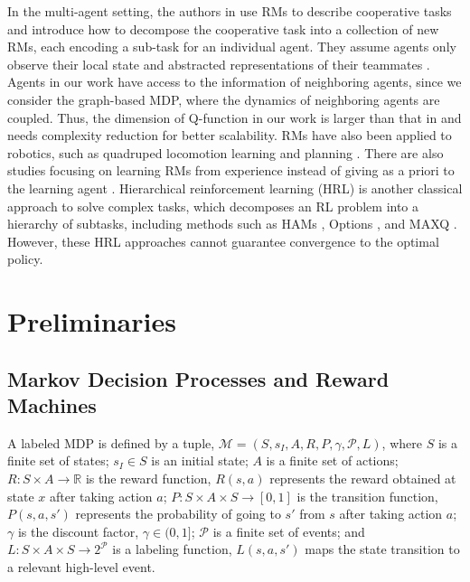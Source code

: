 \documentclass[conf]{new-aiaa}
\begin{document}
In the multi-agent setting, the authors in \cite{neary2020reward} use RMs to describe cooperative tasks and introduce how to decompose the cooperative task into a collection of new RMs, each encoding a sub-task for an individual agent. They assume agents only observe their local state and abstracted representations of their teammates \cite{neary2020reward}. Agents in our work have access to the information of neighboring agents, since we consider the graph-based MDP, where the dynamics of neighboring agents are coupled. Thus, the dimension of Q-function in our work is larger than that in \cite{neary2020reward} and needs complexity reduction for better scalability. RMs have also been applied to robotics, such as quadruped locomotion learning \cite{defazio2021learning} and planning \cite{shah2020planning}. There are also studies focusing on learning RMs from experience instead of giving as a priori to the learning agent \cite{xu2020joint, toro2019learning,furelos2020induction,furelos2021induction,hasanbeig2021deepsynth,rens2020learning}. Hierarchical reinforcement learning (HRL) is another classical approach to solve complex tasks, which decomposes an RL problem into a hierarchy of subtasks, including methods such as HAMs \cite{parr1998reinforcement}, Options \cite{sutton1999between}, and MAXQ \cite{dietterich2000hierarchical}. However, these HRL approaches cannot guarantee convergence to the optimal policy.



\section{Preliminaries}

\subsection{Markov Decision Processes and Reward Machines}

A labeled MDP is defined by a tuple,  $\mathcal{M} = (S, s_I, A, R, P, \gamma, \mathcal{P}, L)$, where $S$ is a finite set of states;  $s_I \in S$ is an initial state; $A$ is a finite set of actions; $R:S \times A \to \mathbb{R}$ is the reward function, $R(s, a)$ represents the reward obtained at state $x$ after taking action $a$; $P: S \times A \times S \to [0, 1]$ is the transition function, $P(s, a, s')$ represents the probability of going to $s'$ from $s$ after taking action $a$; $\gamma$ is the discount factor, $\gamma \in (0, 1]$; $\mathcal{P}$ is a finite set of events; and $L: S \times A \times S \to 2^\mathcal{P}$ is a labeling function,  $L(s, a, s')$ maps the state transition to a relevant high-level event.
\end{document}
